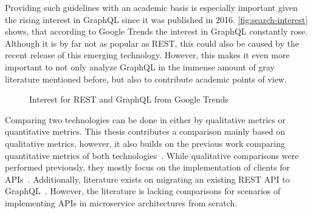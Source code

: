 
Providing such guidelines with an academic basis is especially important given the rising interest in GraphQL since it was published in 2016.
\autoref{fig:search-interest} shows, that according to Google Trends the interest in GraphQL constantly rose.
Although it is by far not as popular as \ac{REST}, this could also be caused by the recent release of this emerging technology.
However, this makes it even more important to not only analyze GraphQL in the immense amount of gray literature mentioned before, but also to contribute academic points of view.

\begin{figure}[h!]
    \centering
    \caption{Interest for \acs{REST} and GraphQL from Google Trends}\label{fig:search-interest}    
\end{figure}

Comparing two technologies can be done in either by qualitative metrics or quantitative metrics.
This thesis contributes a comparison mainly based on qualitative metrics, however, it also builds on the previous work comparing quantitative metrics of both technologies~\cite{Brito2019,Brito2020,Wittern2018,Seabra2019}.
While qualitative comparisons were performed previously, they mostly focus on the implementation of clients for \acp{API}~\cite{Brito2020}.
Additionally, literature exists on migrating an existing \ac{REST} \ac{API} to GraphQL~\cite{Vogel2017, Lama2019, Wittern2018}.
However, the literature is lacking comparisons for scenarios of implementing \acp{API} in microservice architectures from scratch.

